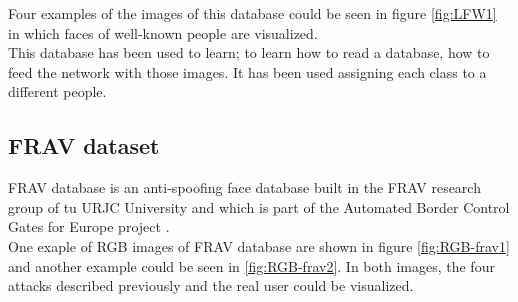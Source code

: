 Four examples of the images of this database could be seen in figure \ref{fig:LFW1} in which faces of well-known people are visualized.\\


This database has been used to learn; to learn how to read a database, how to feed the network with those images. It has been used assigning each class to a different people.\\

\subsection{FRAV dataset}
FRAV database is an anti-spoofing face database built in the FRAV research group of tu URJC University and which is part of the Automated Border Control Gates for Europe project \cite{ABC4EU}.\\

One exaple of RGB images of FRAV database are shown in figure \ref{fig:RGB-frav1} and another example could be seen in \ref{fig:RGB-frav2}. In both images, the four attacks described previously and the real user could be visualized. \\

